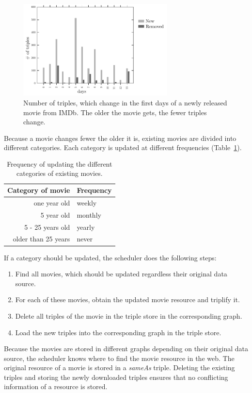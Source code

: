 \begin{figure}[h!]
  \begin{center}
  \includegraphics[width=0.7\textwidth]{images/updating_2.pdf}
  \end{center}
  \caption{Number of triples, which change in the first days of a newly released movie from IMDb. The older the movie gets, the fewer triples change.}
  \label{fig_new_movie}
\end{figure}

Because a movie changes fewer the older it is, existing movies are divided into different categories.
Each category is updated at different frequencies (Table~\ref{tab_updating_existing}).
\begin{table}[ht]
	\begin{center}
	\begin{tabular}{rl}
		\textbf{Category of movie} & \textbf{Frequency} \\ \hline
		one year old & weekly \\
		5 year old & monthly \\
		5 - 25 years old & yearly \\
		older than 25 years & never \\
	\end{tabular}
	\end{center}
	\caption{Frequency of updating the different categories of existing movies.}
	\label{tab_updating_existing}
\end{table}
If a category should be updated, the scheduler does the following steps:
\begin{enumerate}
	\item Find all movies, which should be updated regardless their original data source.
	\item For each of these movies, obtain the updated movie resource and triplify it.
	\item Delete all triples of the movie in the triple store in the corresponding graph.
	\item Load the new triples into the corresponding graph in the triple store.
\end{enumerate}
Because the movies are stored in different graphs depending on their original data source, the scheduler knows where to find the movie resource in the web.
The original resource of a movie is stored in a \emph{sameAs} triple.
Deleting the existing triples and storing the newly downloaded triples ensures that no conflicting information of a resource is stored.